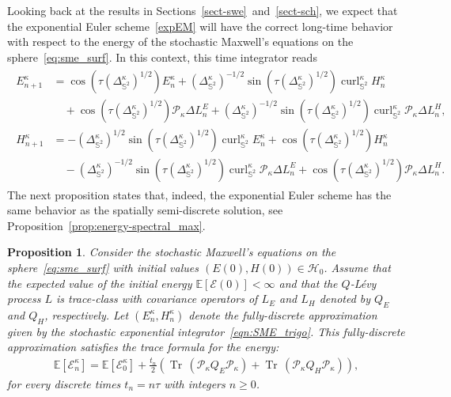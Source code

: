 \documentclass[11pt]{amsart}
\newtheorem{proposition}[theorem]{Proposition}
\newcommand{\E}{{\mathbb E}}
\newcommand{\IS}{\mathbb{S}}
\newcommand{\tr}{{\operatorname{Tr}\, }}
\newcommand{\Deltalb}{\Delta_{\IS^2}}
\newcommand{\cP}{\mathcal{P}}
\begin{document}
Looking back at the results in Sections~\ref{sect-swe}~and~\ref{sect-sch}, we expect that the exponential Euler scheme~\eqref{expEM} will have the correct long-time behavior with respect to the energy of the stochastic Maxwell's equations on the sphere~\eqref{eq:sme_surf}.
In this context, this time integrator reads
\begin{align}\label{eqn:SME_trigo}
	\begin{split}
	E_{n+1}^\kappa&=\cos(\tau(\Deltalb^\kappa)^{1/2})E_{n}^\kappa+(\Deltalb^\kappa)^{-1/2}\sin(\tau(\Deltalb^\kappa)^{1/2})\operatorname{curl}_{\IS^2}^\kappa H_{n}^\kappa\\
	&\quad +\cos(\tau(\Deltalb^\kappa)^{1/2})\cP_\kappa\Delta L^E_n+(\Deltalb^\kappa)^{-1/2}\sin(\tau(\Deltalb^\kappa)^{1/2})\operatorname{curl}_{\IS^2}^\kappa \cP_\kappa\Delta L^H_n,\\
	H_{n+1}^\kappa&=-(\Deltalb^\kappa)^{1/2}\sin(\tau(\Deltalb^\kappa)^{1/2})\operatorname{curl}_{\IS^2}^\kappa E_{n}^\kappa+\cos(\tau(\Deltalb^\kappa)^{1/2})H_{n}^\kappa\\
	&\quad -(\Deltalb^\kappa)^{-1/2}\sin(\tau(\Deltalb^\kappa)^{1/2})\operatorname{curl}_{\IS^2}^\kappa \cP_\kappa\Delta L^E_n+\cos(\tau(\Deltalb^\kappa)^{1/2})\cP_\kappa\Delta L^H_n.
	\end{split}
\end{align}
The next proposition states that, indeed, the exponential Euler scheme has the same behavior as the spatially semi-discrete solution, see Proposition~\ref{prop:energy-spectral_max}.
\begin{proposition}\label{prop:energy-trigo_max}
	Consider the stochastic Maxwell's equations on the sphere~\eqref{eq:sme_surf} with initial values $(E(0),H(0))\in \mathcal H_0$.
	Assume that the expected value of the initial energy $\E\left[\mathcal{E}(0)\right]<\infty$ and that the $Q$-L\'evy process $L$
	is trace-class with covariance operators of $L_E$ and $L_H$ denoted by $Q_E$ and $Q_H$, respectively. Let $(E_{n}^\kappa, H_{n}^\kappa)$ denote the fully-discrete approximation given by the stochastic exponential integrator~\eqref{eqn:SME_trigo}.
	This fully-discrete approximation satisfies the trace formula for the energy:
	\begin{align*}
		\E\left[\mathcal{E}^\kappa_n\right]=\E\left[\mathcal{E}^\kappa_0\right]+\frac{t_n}2\left(\tr\left(\cP_\kappa Q_E\cP_\kappa\right)+\tr\left(\cP_\kappa Q_H\cP_\kappa\right)\right),
	\end{align*}
	for every discrete times $t_n=n\tau$ with integers $n\geq0$.
\end{proposition}
\end{document}
